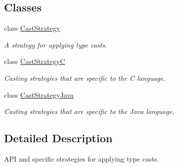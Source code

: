 \subsection*{Classes}
\begin{DoxyCompactItemize}
\item 
class \mbox{\hyperlink{class_cast_strategy}{Cast\+Strategy}}
\begin{DoxyCompactList}\small\item\em A strategy for applying type casts. \end{DoxyCompactList}\item 
class \mbox{\hyperlink{class_cast_strategy_c}{Cast\+StrategyC}}
\begin{DoxyCompactList}\small\item\em Casting strategies that are specific to the C language. \end{DoxyCompactList}\item 
class \mbox{\hyperlink{class_cast_strategy_java}{Cast\+Strategy\+Java}}
\begin{DoxyCompactList}\small\item\em Casting strategies that are specific to the Java language. \end{DoxyCompactList}\end{DoxyCompactItemize}


\subsection{Detailed Description}
A\+PI and specific strategies for applying type casts. 

